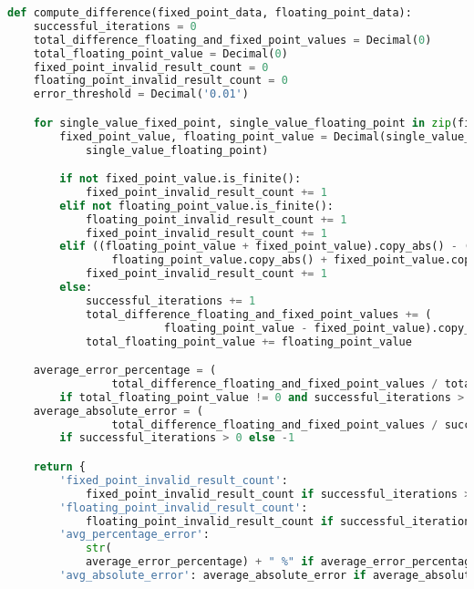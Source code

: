 \begin{lstlisting}[language=python,label=lst:validate_new,caption=Validate new]
def compute_difference(fixed_point_data, floating_point_data):
    successful_iterations = 0
    total_difference_floating_and_fixed_point_values = Decimal(0)
    total_floating_point_value = Decimal(0)
    fixed_point_invalid_result_count = 0
    floating_point_invalid_result_count = 0
    error_threshold = Decimal('0.01')

    for single_value_fixed_point, single_value_floating_point in zip(fixed_point_data, floating_point_data):
        fixed_point_value, floating_point_value = Decimal(single_value_fixed_point), Decimal(
            single_value_floating_point)

        if not fixed_point_value.is_finite():
            fixed_point_invalid_result_count += 1
        elif not floating_point_value.is_finite():
            floating_point_invalid_result_count += 1
            fixed_point_invalid_result_count += 1
        elif ((floating_point_value + fixed_point_value).copy_abs() - (
                floating_point_value.copy_abs() + fixed_point_value.copy_abs())) > error_threshold:
            fixed_point_invalid_result_count += 1
        else:
            successful_iterations += 1
            total_difference_floating_and_fixed_point_values += (
                        floating_point_value - fixed_point_value).copy_abs()
            total_floating_point_value += floating_point_value

    average_error_percentage = (
                total_difference_floating_and_fixed_point_values / total_floating_point_value * 100) \
        if total_floating_point_value != 0 and successful_iterations > 0 else -1
    average_absolute_error = (
                total_difference_floating_and_fixed_point_values / successful_iterations) \
        if successful_iterations > 0 else -1

    return {
        'fixed_point_invalid_result_count': 
            fixed_point_invalid_result_count if successful_iterations > 0 else "no successful iterations",
        'floating_point_invalid_result_count': 
            floating_point_invalid_result_count if successful_iterations > 0 else "no successful iterations",
        'avg_percentage_error': 
            str(
            average_error_percentage) + " %" if average_error_percentage != -1 else "no successful iterations",
        'avg_absolute_error': average_absolute_error if average_absolute_error != -1 else "no successful iterations"}

\end{lstlisting} 


